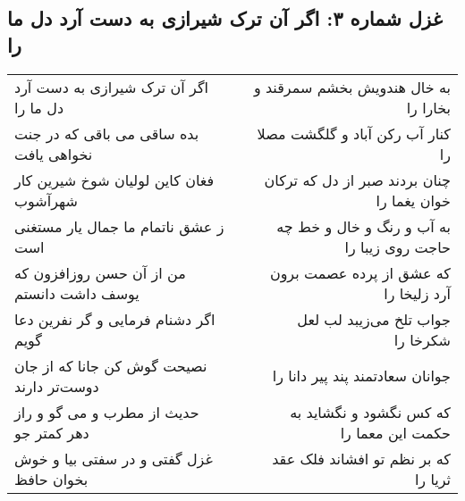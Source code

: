 \begin{center}
\section*{غزل شماره ۳: اگر آن ترک شیرازی به دست آرد دل ما را}
\label{sec:sh003}
\begin{longtable}{l p{0.5cm} r}
اگر آن ترک شیرازی به دست آرد دل ما را
&&
به خال هندویش بخشم سمرقند و بخارا را
\\
بده ساقی می باقی که در جنت نخواهی یافت
&&
کنار آب رکن آباد و گلگشت مصلا را
\\
فغان کاین لولیان شوخ شیرین کار شهرآشوب
&&
چنان بردند صبر از دل که ترکان خوان یغما را
\\
ز عشق ناتمام ما جمال یار مستغنی است
&&
به آب و رنگ و خال و خط چه حاجت روی زیبا را
\\
من از آن حسن روزافزون که یوسف داشت دانستم
&&
که عشق از پرده عصمت برون آرد زلیخا را
\\
اگر دشنام فرمایی و گر نفرین دعا گویم
&&
جواب تلخ می‌زیبد لب لعل شکرخا را
\\
نصیحت گوش کن جانا که از جان دوست‌تر دارند
&&
جوانان سعادتمند پند پیر دانا را
\\
حدیث از مطرب و می گو و راز دهر کمتر جو
&&
که کس نگشود و نگشاید به حکمت این معما را
\\
غزل گفتی و در سفتی بیا و خوش بخوان حافظ
&&
که بر نظم تو افشاند فلک عقد ثریا را
\\
\end{longtable}
\end{center}
